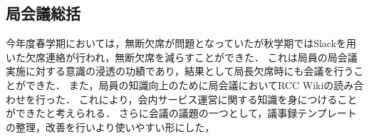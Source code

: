 \subsection*{局会議総括}


今年度春学期においては，無断欠席が問題となっていたが秋学期ではSlackを用いた欠席連絡が行われ，無断欠席を減らすことができた．
これは局員の局会議実施に対する意識の浸透の功績であり，結果として局長欠席時にも会議を行うことができた．
また，局員の知識向上のために局会議においてRCC Wikiの読み合わせを行った．
これにより，会内サービス運営に関する知識を身につけることができたと考えられる．
さらに会議の議題の一つとして，議事録テンプレートの整理，改善を行いより使いやすい形にした，

